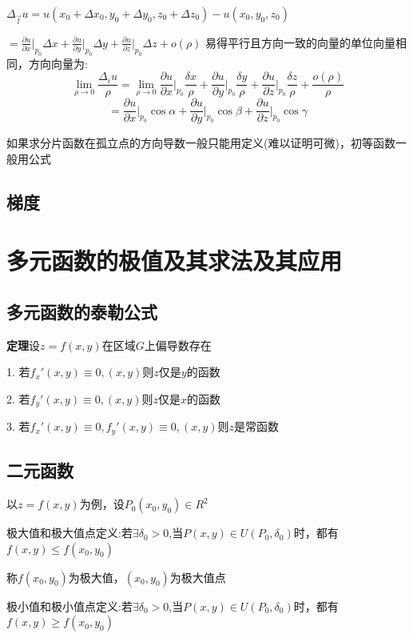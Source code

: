 \documentclass{ctexart}
\begin{document}
      $\Delta_{\vec l} u = u(x_0 + \Delta x_0,y_0 + \Delta y_0,z_0 + \Delta z_0) - u(x_0,y_0,z_0) $

      $= \frac{\partial u}{\partial x}\vert_{p_0} \Delta x + \frac{\partial u}{\partial y}\vert_{p_0} \Delta y + \frac{\partial u}{\partial z}\vert_{p_0} \Delta z + o(\rho)$
      易得平行且方向一致的向量的单位向量相同，方向向量为:
      $$\lim_{\rho \to 0} {\frac{\Delta_i u}{\rho}} = \lim_{\rho \to 0}{\frac{\partial u}{\partial x}\vert_{p_0} \frac{\delta x}{\rho} + \frac{\partial u}{\partial y}\vert_{p_0} \frac{\delta y}{\rho} + \frac{\partial u}{\partial z}\vert_{p_0} \frac{\delta z}{\rho} + \frac{o(\rho)}{\rho}}$$
      $$= \frac{\partial u}{\partial x}\vert_{p_0} \cos \alpha + \frac{\partial u}{\partial y}\vert_{p_0} \cos \beta + \frac{\partial u}{\partial z}\vert_{p_0} \cos \gamma$$

      如果求分片函数在孤立点的方向导数一般只能用定义(难以证明可微)，初等函数一般用公式

      \subsection{梯度}
  \section{多元函数的极值及其求法及其应用}
  \subsection{多元函数的泰勒公式}
  \textbf{定理}设$z = f(x,y)$在区域$G$上偏导数存在
  
  1. 若$f_x'(x,y) \equiv  0,(x,y)$则$z$仅是$y$的函数

  2. 若$f_y'(x,y) \equiv  0,(x,y)$则$z$仅是$x$的函数

  3. 若$f_x'(x,y) \equiv  0,f_y'(x,y) \equiv  0,(x,y)$则$z$是常函数
  \subsection{二元函数}
      以$z=f(x,y)$为例，设$P_0(x_0,y_0) \in R^2$
      
      极大值和极大值点定义:若$\exists \delta_0 >0$,当$P(x,y)\in U(P_0,\delta_0)$时，都有$f(x,y) \le f(x_0,y_0)$

      称$f(x_0,y_0)$为极大值，$(x_0,y_0)$为极大值点

      极小值和极小值点定义:若$\exists \delta_0 >0$,当$P(x,y)\in U(P_0,\delta_0)$时，都有$f(x,y) \ge f(x_0,y_0)$
\end{document}
